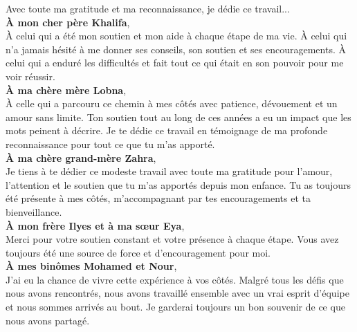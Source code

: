 \begin{center}
  \begin{minipage}{0.85\textwidth}
    \centering
    \normalsize\itshape

    Avec toute ma gratitude et ma reconnaissance, je dédie ce travail...\\

    \textbf{À mon cher père Khalifa},\\

    À celui qui a été mon soutien et mon aide à chaque étape de ma vie. À celui qui n'a jamais hésité à me donner ses conseils, son soutien et ses encouragements. À celui qui a enduré les difficultés et fait tout ce qui était en son pouvoir pour me voir réussir.\\

    \textbf{À ma chère mère Lobna},\\

    À celle qui a parcouru ce chemin à mes côtés avec patience, dévouement et un amour sans limite. Ton soutien tout au long de ces années a eu un impact que les mots peinent à décrire. Je te dédie ce travail en témoignage de ma profonde reconnaissance pour tout ce que tu m’as apporté.\\

     \textbf{À ma chère grand-mère Zahra},\\

  Je tiens à te dédier ce modeste travail avec toute ma gratitude pour l’amour, l’attention et le soutien que tu m’as apportés depuis mon enfance. Tu as toujours été présente à mes côtés, m’accompagnant par tes encouragements et ta bienveillance.\\

    \textbf{À mon frère Ilyes et à ma sœur Eya},\\

    Merci pour votre soutien constant et votre présence à chaque étape. Vous avez toujours été une source de force et d'encouragement pour moi.\\

    \textbf{À mes binômes Mohamed et Nour},\\

    J'ai eu la chance de vivre cette expérience à vos côtés. Malgré tous les défis que nous avons rencontrés, nous avons travaillé ensemble avec un vrai esprit d'équipe et nous sommes arrivés au bout. Je garderai toujours un bon souvenir de ce que nous avons partagé.\\


\end{minipage}
\end{center}
